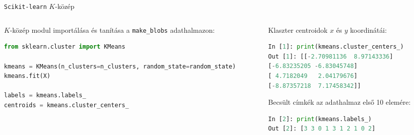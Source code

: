 \documentclass[english, aspectratio=169]{beamer}
\begin{document}
\begin{frame}[fragile]{\texttt{Scikit-learn} $K$-közép }
	\begin{columns}
		\begin{column}{.5\textwidth}
			$K$-közép modul importálása és tanítása a \texttt{make\_blobs} adathalmazon:
			\begin{lstlisting}[language=python]
from sklearn.cluster import KMeans

kmeans = KMeans(n_clusters=n_clusters, random_state=random_state)
kmeans.fit(X)

labels = kmeans.labels_
centroids = kmeans.cluster_centers_
			\end{lstlisting}
		\end{column}
		\begin{column}{.5\textwidth}
			Klaszter centroidok $x$ és $y$ koordinátái:
			\begin{lstlisting}[language=python]
 In [1]: print(kmeans.cluster_centers_)
Out [1]: [[-2.70981136  8.97143336]
[-6.83235205 -6.83045748]
[ 4.7182049   2.04179676]
[-8.87357218  7.17458342]]
			\end{lstlisting}
			\par\medskip
			Becsült címkék az adathalmaz első 10 elemére:
			\begin{lstlisting}[language=python]
 In [2]: print(kmeans.labels_)
Out [2]: [3 3 0 1 3 1 2 1 0 2]
			\end{lstlisting}
		\end{column}
	\end{columns}
\end{frame}
\end{document}
